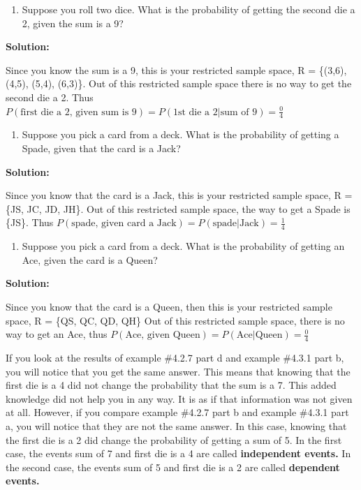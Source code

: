 \documentclass[
]{book}
\providecommand{\tightlist}{%
  \setlength{\itemsep}{0pt}\setlength{\parskip}{0pt}}
\begin{document}
\begin{enumerate}
\def\labelenumi{\alph{enumi}.}
\setcounter{enumi}{2}
\tightlist
\item
  Suppose you roll two dice. What is the probability of getting the
  second die a 2, given the sum is a 9?
\end{enumerate}

\textbf{Solution:}

Since you know the sum is a 9, this is your restricted sample space, R = \{(3,6), (4,5), (5,4), (6,3)\}. Out of this restricted sample space there is no way to get the second die a 2. Thus \(P(\text{first die a 2, given sum is 9})=P(\text{1st die a 2}|\text{sum of 9})=\frac{0}{4}\)

\begin{enumerate}
\def\labelenumi{\alph{enumi}.}
\setcounter{enumi}{3}
\tightlist
\item
  Suppose you pick a card from a deck. What is the probability of getting a Spade, given that the card is a Jack?
\end{enumerate}

\textbf{Solution:}

Since you know that the card is a Jack, this is your restricted sample space, R = \{JS, JC, JD, JH\}. Out of this restricted sample space, the way to get a Spade is \{JS\}. Thus \(P(\text{spade, given card a Jack})=P(\text{spade}|\text{Jack})=\frac{1}{4}\)

\begin{enumerate}
\def\labelenumi{\alph{enumi}.}
\setcounter{enumi}{4}
\tightlist
\item
  Suppose you pick a card from a deck. What is the probability of getting an Ace, given the card is a Queen?
\end{enumerate}

\textbf{Solution:}

Since you know that the card is a Queen, then this is your restricted sample space, R = \{QS, QC, QD, QH\} Out of this restricted sample space, there is no way to get an Ace, thus \(P(\text{Ace, given Queen})=P(\text{Ace}|\text{Queen})=\frac{0}{4}\)

If you look at the results of example \#4.2.7 part d and example \#4.3.1 part b, you will notice that you get the same answer. This means that knowing that the first die is a 4 did not change the probability that the sum is a 7. This added knowledge did not help you in any way. It is as if that information was not given at all. However, if you compare example \#4.2.7 part b and example \#4.3.1 part a, you will notice that they are not the same answer. In this case, knowing that the first die is a 2 did change the probability of getting a sum of 5. In the first case, the events sum of 7 and first die is a 4 are called \textbf{independent events.} In the second case, the events sum of 5 and first die is a 2 are called \textbf{dependent events.}
\end{document}
